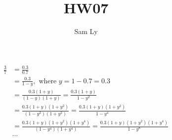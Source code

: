 \documentclass{article}
\title{HW07}
\author{Sam Ly}
\begin{document}
\maketitle

\begin{align*}
    \frac{3}{7} & = \frac{0.3}{0.7} \\
    & = \frac{0.3}{1 - y}, \text{ where } y = 1 - 0.7 = 0.3 \\
    & = \frac{0.3(1+y)}{(1-y)(1+y)} = \frac{0.3(1+y)}{1 - y^2} \\
    & = \frac{0.3(1+y)(1+y^2)}{(1-y^2)(1+y^2)} = \frac{0.3(1+y)(1+y^2)}{1-y^4} \\
    & = \frac{0.3(1+y)(1+y^2)(1+y^4)}{(1-y^4)(1+y^4)} = \frac{0.3(1+y)(1+y^2)(1+y^4)}{1-y^8} \\
    & \cdots
\end{align*}
\end{document}
